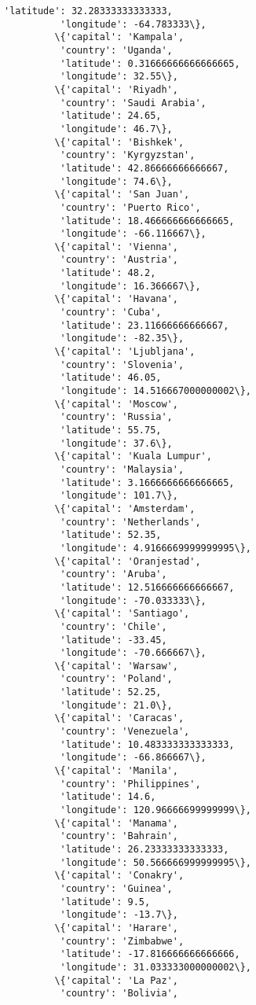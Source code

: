 \documentclass[11pt]{article}
\begin{document}
\begin{Verbatim}[commandchars=\\\{\}]
          'latitude': 32.28333333333333,
          'longitude': -64.783333\},
         \{'capital': 'Kampala',
          'country': 'Uganda',
          'latitude': 0.31666666666666665,
          'longitude': 32.55\},
         \{'capital': 'Riyadh',
          'country': 'Saudi Arabia',
          'latitude': 24.65,
          'longitude': 46.7\},
         \{'capital': 'Bishkek',
          'country': 'Kyrgyzstan',
          'latitude': 42.86666666666667,
          'longitude': 74.6\},
         \{'capital': 'San Juan',
          'country': 'Puerto Rico',
          'latitude': 18.466666666666665,
          'longitude': -66.116667\},
         \{'capital': 'Vienna',
          'country': 'Austria',
          'latitude': 48.2,
          'longitude': 16.366667\},
         \{'capital': 'Havana',
          'country': 'Cuba',
          'latitude': 23.11666666666667,
          'longitude': -82.35\},
         \{'capital': 'Ljubljana',
          'country': 'Slovenia',
          'latitude': 46.05,
          'longitude': 14.516667000000002\},
         \{'capital': 'Moscow',
          'country': 'Russia',
          'latitude': 55.75,
          'longitude': 37.6\},
         \{'capital': 'Kuala Lumpur',
          'country': 'Malaysia',
          'latitude': 3.1666666666666665,
          'longitude': 101.7\},
         \{'capital': 'Amsterdam',
          'country': 'Netherlands',
          'latitude': 52.35,
          'longitude': 4.9166669999999995\},
         \{'capital': 'Oranjestad',
          'country': 'Aruba',
          'latitude': 12.516666666666667,
          'longitude': -70.033333\},
         \{'capital': 'Santiago',
          'country': 'Chile',
          'latitude': -33.45,
          'longitude': -70.666667\},
         \{'capital': 'Warsaw',
          'country': 'Poland',
          'latitude': 52.25,
          'longitude': 21.0\},
         \{'capital': 'Caracas',
          'country': 'Venezuela',
          'latitude': 10.483333333333333,
          'longitude': -66.866667\},
         \{'capital': 'Manila',
          'country': 'Philippines',
          'latitude': 14.6,
          'longitude': 120.96666699999999\},
         \{'capital': 'Manama',
          'country': 'Bahrain',
          'latitude': 26.23333333333333,
          'longitude': 50.566666999999995\},
         \{'capital': 'Conakry',
          'country': 'Guinea',
          'latitude': 9.5,
          'longitude': -13.7\},
         \{'capital': 'Harare',
          'country': 'Zimbabwe',
          'latitude': -17.816666666666666,
          'longitude': 31.033333000000002\},
         \{'capital': 'La Paz',
          'country': 'Bolivia',

\end{Verbatim}
\end{document}
